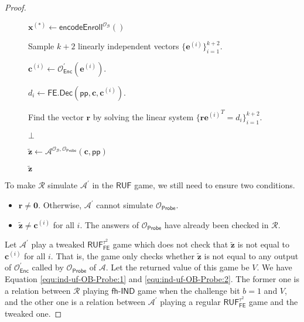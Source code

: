 \begin{proof}
\begin{figure}[h]
\begin{minipage}[t]{0.8\linewidth}
\begin{algorithm}[H]
\begin{algorithmic}[1]
		\State $\mathbf{x}^{(*)} \gets \textsf{encodeEnroll}^{ \mathcal{O}_{\mathcal{B}} } ()$

		\State Sample $k+2$ linearly independent vectors $\{ \mathbf{e}^{(i)} \}_{i=1}^{k+2}$.

			\State $\mathbf{c}^{(i)} \gets \mathcal{O}^\prime_{\textsf{Enc}}(\mathbf{e}^{(i)})$.

			\State $d_i \gets \textsf{FE.Dec}(\textsf{pp}, \mathbf{c}, \mathbf{c}^{(i)})$.
		\EndFor

		\State Find the vector $\mathbf{r}$ by solving the linear system $\{ \mathbf{r} {\mathbf{e}^{(i)}}^T = d_i \}_{i=1}^{k+2}$.


			\State \Return $\bot$

		\EndIf

		\State ${\mathbf{\tilde{z}}} \gets \mathcal{A}^{\mathcal{O}_{\mathcal{B}}, \mathcal{O}_{\textsf{Probe}} } ( \mathbf{c}, \textsf{pp})$
		
		\State \Return ${\mathbf{\tilde{z}}}$
	\end{algorithmic}
	\end{algorithm}
	\end{minipage}
	
\end{figure}

To make $\mathcal{R}$ simulate $\mathcal{A}^\prime$ in the $\textsf{RUF}$ game, we still need to ensure two conditions.

\begin{itemize}

	\item $\mathbf{r} \neq \mathbf{0}$. Otherwise, $\mathcal{A}^\prime$ cannot simulate $\mathcal{O}_\textsf{Probe}$. 

	\item $\mathbf{\tilde{z}} \neq \mathbf{c}^{(i)}$ for all $i$. The answers of $\mathcal{O}_\textsf{Probe}$ have already been checked in $\mathcal{R}$. 
\end{itemize}

Let $\mathcal{A}^\prime$ play a tweaked $\textsf{RUF}_\textsf{FE}^{\tau^2}$ game which does not check that $\mathbf{\tilde{z}}$ is not equal to $\mathbf{c}^{(i)}$ for all $i$. That is, the game only checks whether $\mathbf{\tilde{z}}$ is not equal to any output of $\mathcal{O}^\prime_\textsf{Enc}$ called by $\mathcal{O}_\textsf{Probe}$ of $\mathcal{A}$. Let the returned value of this game be $V$. We have Equation \ref{equ:ind-uf-OB-Probe:1} and \ref{equ:ind-uf-OB-Probe:2}. The former one is a relation between $\mathcal{R}$ playing $\textsf{fh-IND}$ game when the challenge bit $b=1$ and $V$, and the other one is a relation between $\mathcal{A}^\prime$ playing a regular $\textsf{RUF}_\textsf{FE}^{\tau^2}$ game and the tweaked one.


\end{proof}

